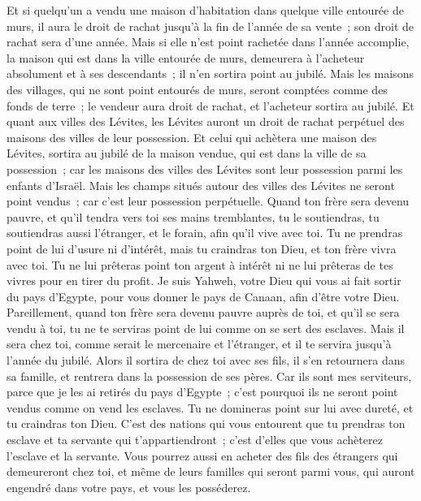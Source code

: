 \begin{multicols}{2}
Et si quelqu'un a vendu une maison d'habitation dans quelque ville entourée de murs, il aura le droit de rachat jusqu'à la fin de l'année de sa vente~; son droit de rachat sera d'une année.
Mais si elle n'est point rachetée dans l'année accomplie, la maison qui est dans la ville entourée de murs, demeurera à l'acheteur absolument et à ses descendants~; il n'en sortira point au jubilé.
Mais les maisons des villages, qui ne sont point entourés de murs, seront comptées comme des fonds de terre~; le vendeur aura droit de rachat, et l'acheteur sortira au jubilé.
Et quant aux villes des Lévites, les Lévites auront un droit de rachat perpétuel des maisons des villes de leur possession.
Et celui qui achètera une maison des Lévites, sortira au jubilé de la maison vendue, qui est dans la ville de sa possession~; car les maisons des villes des Lévites sont leur possession parmi les enfants d'Israël.
Mais les champs situés autour des villes des Lévites ne seront point vendus~; car c'est leur possession perpétuelle.
Quand ton frère sera devenu pauvre, et qu'il tendra vers toi ses mains tremblantes, tu le soutiendras, tu soutiendras aussi l'étranger, et le forain, afin qu'il vive avec toi.
Tu ne prendras point de lui d'usure ni d'intérêt, mais tu craindras ton Dieu, et ton frère vivra avec toi.
Tu ne lui prêteras point ton argent à intérêt ni ne lui prêteras de tes vivres pour en tirer du profit.
Je suis Yahweh, votre Dieu qui vous ai fait sortir du pays d'Egypte, pour vous donner le pays de Canaan, afin d'être votre Dieu.
Pareillement, quand ton frère sera devenu pauvre auprès de toi, et qu'il se sera vendu à toi, tu ne te serviras point de lui comme on se sert des esclaves.
Mais il sera chez toi, comme serait le mercenaire et l'étranger, et il te servira jusqu'à l'année du jubilé.
Alors il sortira de chez toi avec ses fils, il s'en retournera dans sa famille, et rentrera dans la possession de ses pères.
Car ils sont mes serviteurs, parce que je les ai retirés du pays d'Egypte~; c'est pourquoi ils ne seront point vendus comme on vend les esclaves.
Tu ne domineras point sur lui avec dureté, et tu craindras ton Dieu.
C'est des nations qui vous entourent que tu prendras ton esclave et ta servante qui t'appartiendront~; c'est d'elles que vous achèterez l'esclave et la servante.
Vous pourrez aussi en acheter des fils des étrangers qui demeureront chez toi, et même de leurs familles qui seront parmi vous, qui auront engendré dans votre pays, et vous les posséderez.

\end{multicols}
